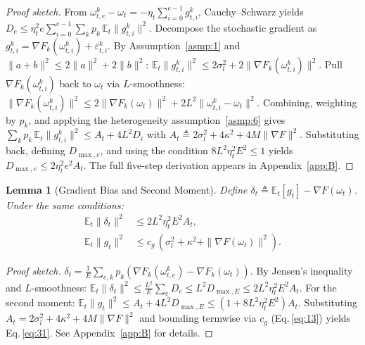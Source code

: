 \documentclass[journal]{IEEEtran}
\newtheorem{lemma}{Lemma}
\begin{document}
\begin{proof}[Proof sketch]
  From \(\omega_{t,e}^k - \omega_t = -\eta_t\sum_{i=0}^{e-1}g_{t,i}^k\), Cauchy--Schwarz yields
  \(D_e \le \eta_t^2 e\sum_{i=0}^{e-1}\sum_k p_k\,\mathbb E_t\|g_{t,i}^k\|^2\).
  Decompose the stochastic gradient as \(g_{t,i}^k = \nabla F_k(\omega_{t,i}^k) + \varepsilon_{t,i}^k\).
  By Assumption~\ref{asmp:1} and \(\|a+b\|^2 \le 2\|a\|^2 + 2\|b\|^2\):
  \(\mathbb E_t\|g_{t,i}^k\|^2 \le 2\sigma_l^2 + 2\|\nabla F_k(\omega_{t,i}^k)\|^2\).
  Pull \(\nabla F_k(\omega_{t,i}^k)\) back to \(\omega_t\) via \(L\)-smoothness:
  \(\|\nabla F_k(\omega_{t,i}^k)\|^2 \le 2\|\nabla F_k(\omega_t)\|^2 + 2L^2\|\omega_{t,i}^k - \omega_t\|^2\).
  Combining, weighting by \(p_k\), and applying the heterogeneity assumption~\ref{asmp:6} gives
  \(\sum_k p_k\,\mathbb E_t\|g_{t,i}^k\|^2 \le A_t + 4L^2 D_i\) with
  \(A_t \triangleq 2\sigma_l^2 + 4\kappa^2 + 4M\|\nabla F\|^2\).
  Substituting back, defining \(D_{\max,e}\), and using the condition \(8L^2\eta_t^2E^2\le 1\) yields
  \(D_{\max,e} \le 2\eta_t^2 e^2 A_t\).
  The full five-step derivation appears in Appendix~\ref{app:B}.
\end{proof}

\begin{lemma}[Gradient Bias and Second Moment]\label{lem:2}
  Define \(\delta_t \triangleq \mathbb E_t[g_t] - \nabla F(\omega_t)\). Under the same conditions:
  \begin{align}
    \mathbb E_t\|\delta_t\|^2 &\le 2L^2\eta_t^2 E^2 A_t, \label{eq:30}\\
    \mathbb E_t\|g_t\|^2 &\le c_g\,(\sigma_l^2 + \kappa^2 + \|\nabla F(\omega_t)\|^2). \label{eq:31}
  \end{align}
\end{lemma}

\begin{proof}[Proof sketch]
  \(\delta_t = \frac{1}{E}\sum_{e,k} p_k(\nabla F_k(\omega_{t,e}^k) - \nabla F_k(\omega_t))\).
  By Jensen's inequality and \(L\)-smoothness:
  \(\mathbb E_t\|\delta_t\|^2 \le \frac{L^2}{E}\sum_e D_e \le L^2 D_{\max,E} \le 2L^2\eta_t^2 E^2 A_t\).
  For the second moment:
  \(\mathbb E_t\|g_t\|^2 \le A_t + 4L^2 D_{\max,E} \le (1+8L^2\eta_t^2 E^2)A_t\).
  Substituting \(A_t = 2\sigma_l^2 + 4\kappa^2 + 4M\|\nabla F\|^2\) and bounding termwise via \(c_g\) (Eq.\,\eqref{eq:13}) yields Eq.\,\eqref{eq:31}.
  See Appendix~\ref{app:B} for details.
\end{proof}

\end{document}
